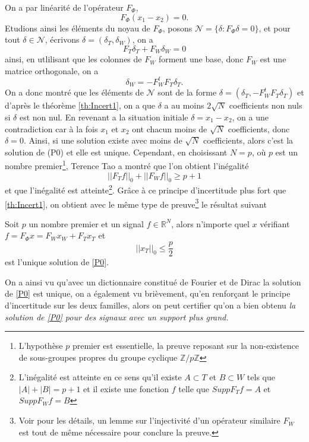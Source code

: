 \begin{exemple}
	On a par linéarité de l'opérateur $F_\Phi$, 
	\begin{equation}
		F_\Phi( x_1 - x_2) = 0.
	\end{equation}
	Etudions ainsi les éléments du noyau de $F_\Phi$, posons $\mathcal{N} = \{\delta : F_\Phi \delta = 0\}$, et pour tout $\delta \in \mathcal{N}$, écrivons $\delta = (\delta_T, \delta_W)$, on a
	\begin{equation}
		F_T \delta_T + F_W \delta_W = 0
	\end{equation}
	ainsi, en utlilisant que les colonnes de $F_W$ forment une base, donc $F_W$ est une matrice orthogonale, on a 
	\begin{equation}\label{eq:structN}
		\delta_W = -F_W^t F_T \delta_T .
	\end{equation}
	On a donc montré que les éléments de $\mathcal{N}$ sont de la forme $\delta = (\delta_T, -F_W^t F_T \delta_T)$ et d'après le théorème \ref{th:Incert1}, on a que $\delta$ a au moins $2\sqrt{N}$ coefficients non nuls si $\delta$ est non nul. 
	En revenant a la situation initiale $\delta = x_1 - x_2$, on a une contradiction car à la fois $x_1$ et $x_2$ ont chacun moins de $\sqrt{N}$ coefficients, donc $\delta = 0$.
	Ainsi, si une solution existe avec moins de $\sqrt{N}$ coefficients, alors c'est la solution de (P0) et elle est unique.
	\newline
	Cependant, en choisissant $N = p$, où $p$ est un nombre premier\footnote{L'hypothèse $p$ premier est essentielle, la preuve reposant sur la non-existence de sous-groupes propres du groupe cyclique $\mathbb{Z}/p\mathbb{Z}$}, Terence Tao \cite{taoprime} a montré que l'on obtient l'inégalité
	\begin{equation}
		||F_T f||_0 + ||F_W f||_0 \geq p + 1
	\end{equation}
	et que l'inégalité est atteinte\footnote{L'inégalité est atteinte en ce sens qu'il existe $A\subset T$ et $B\subset W$ tels que $|A| + |B| = p+1$ et il existe une fonction $f$ telle que $Supp F_T f = A$ et $Supp F_W f = B$}.
	Grâce à ce principe d'incertitude plus fort que \ref{th:Incert1}, on obtient avec le même type de preuve\footnote{Voir \cite{CRT} pour les détails, un lemme sur l'injectivité d'un opérateur similaire $F_W$ est tout de même nécessaire pour conclure la preuve.} le résultat suivant
	\begin{theoreme}
		Soit $p$ un nombre premier et un signal $f \in \mathbb{R}^N$, alors n'importe quel $x$ vérifiant $f = F_\Phi x = F_W x_W + F_T x_T$ et
		\begin{equation}\label{eq:Incert2}
		||x_T||_0 \leq \frac{p}{2}
		\end{equation}
		est l'unique solution de \ref{P0}.
	\end{theoreme}
	On a ainsi vu qu'avec un dictionnaire constitué de Fourier et de Dirac la solution de \ref{P0} est unique, on a également vu brièvement, qu'en renforçant le principe d'incertitude sur les deux familles, alors on peut certifier qu'on a bien obtenu \it{la} solution de \ref{P0} pour des signaux avec un support plus grand.
\end{exemple}

